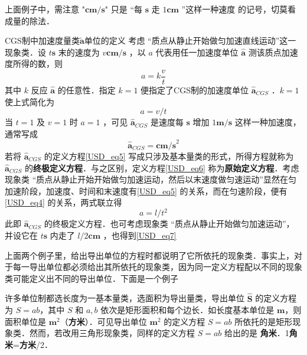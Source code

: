 上面例子中，需注意 "$\boldsymbol{cm/s}$" 只是 “每 $\boldsymbol{s}$ 走 $1\boldsymbol{cm}$ ”这样一种速度 的记号，切莫看成量的除法．
\begin{example}{CGS制中加速度量类$\tilde{\boldsymbol{a}}$单位的定义}
考虑 “质点从静止开始做匀加速直线运动”这一现象类．设 $t\boldsymbol{s}$ 末的速度为 $v\boldsymbol{cm/s}$ ，以 $a$ 代表用任一加速度单位 $\hat{\boldsymbol{a}}$ 测该质点加速度所得的数，则
\begin{equation}\label{USD_eq6}
a=k\frac{v}{t}
\end{equation}
其中 $k$ 反应 $\hat{\boldsymbol{a}}$ 的任意性．指定 $k=1$ 便指定了CGS制的加速度单位 $\hat{\boldsymbol{a}}_{CGS}$ ．$k=1$ 使上式简化为
\begin{equation}\label{USD_eq5}
a=v/t
\end{equation}
当 $t=1$ 及 $v=1$ 时 $a=1$ ，可见 $\hat{\boldsymbol{a}}_{CGS}$ 是速度每 $\boldsymbol{s}$ 增加 $1\boldsymbol{m/s}$ 这样一种加速度，通常写成
\begin{equation}
\hat{\boldsymbol{a}}_{CGS}=\boldsymbol{cm/s}^2
\end{equation}
若将 $\hat{\boldsymbol{a}}_{CGS}$ 的定义方程\autoref{USD_eq5} 写成只涉及基本量类的形式，所得方程就称为  $\hat{\boldsymbol{a}}_{CGS}$ 的\textbf{终极定义方程}．与之区别，定义方程\autoref{USD_eq6} 称为\textbf{原始定义方程}．考虑现象类 “质点从静止开始开始做匀加速运动，然后以末速度做匀速运动”显然在匀加速阶段，加速度、时间和末速度有\autoref{USD_eq5} 的关系，而在匀速阶段，便有\autoref{USD_eq4} 的关系，两式联立得
\begin{equation}\label{USD_eq7}
a=l/t^2
\end{equation}
此即 $\hat{\boldsymbol{a}}_{CGS}$ 的终极定义方程．也可考虑现象类 “质点从静止开始做匀加速运动”，并设它在 $t\boldsymbol{s}$ 内走了 $l/2\boldsymbol{cm}$ ，也得到\autoref{USD_eq7} 
\end{example}
上面两个例子里，给出导出单位的方程时都说明了它所依托的现象类．事实上，对于每一导出单位都必须给出其所依托的现象类，因为同一定义方程配以不同的现象类可能定义出不同的导出单位．下面是一个例子
\begin{example}{}
许多单位制都选长度为一基本量类，选面积为导出量类，导出单位 $\hat{\boldsymbol{S}}$ 的定义方程为 $S=ab$，其中 $S$ 和 $a,b$ 依次是矩形面积和每个边长．如长度基本单位是 $\boldsymbol{m}$，则面积单位是 $\boldsymbol{m}^2$（\textbf{方米}）．可见导出单位 $\boldsymbol{m}^2$ 的定义方程 $S=ab$ 所依托的是矩形现象类．然而，若改用三角形现象类，同样的定义方程 $S=ab$ 给出的是 \textbf{角米}．1\textbf{角米}=\textbf{方米}/2．
\end{example}

